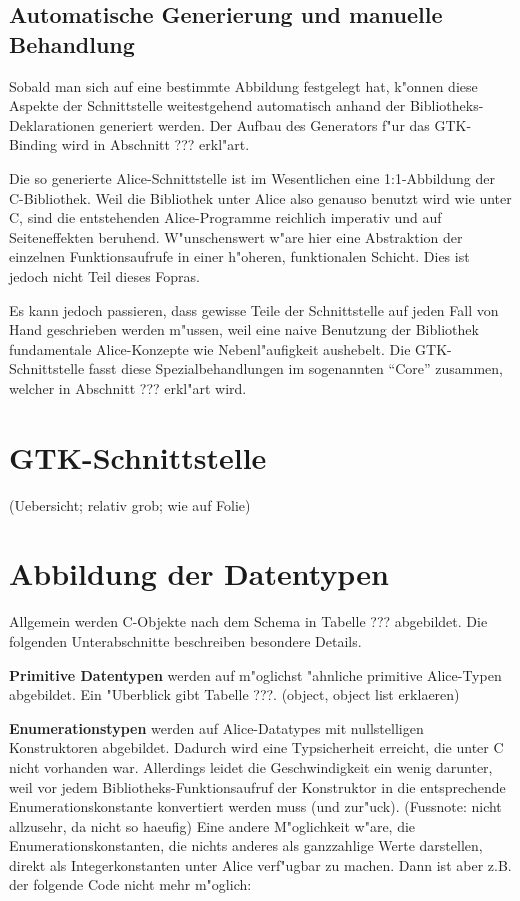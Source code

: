\documentclass{article}
\begin{document}
\subsection{Automatische Generierung und manuelle Behandlung}

Sobald man sich auf eine bestimmte Abbildung festgelegt hat, k"onnen diese
Aspekte der Schnittstelle weitestgehend automatisch anhand der Bibliotheks-
Deklarationen generiert werden. Der Aufbau des Generators f"ur das GTK-Binding
wird in Abschnitt ??? erkl"art.

Die so generierte Alice-Schnittstelle ist im Wesentlichen eine 1:1-Abbildung
der C-Bibliothek. Weil die Bibliothek unter Alice also genauso benutzt wird
wie unter C, sind die entstehenden Alice-Programme reichlich imperativ und auf
Seiteneffekten beruhend. W"unschenswert w"are hier eine Abstraktion der
einzelnen Funktionsaufrufe in einer h"oheren, funktionalen Schicht.
Dies ist jedoch nicht Teil dieses Fopras.

Es kann jedoch passieren, dass gewisse Teile der Schnittstelle auf jeden Fall
von Hand geschrieben werden m"ussen, weil eine naive Benutzung der Bibliothek
fundamentale Alice-Konzepte wie Nebenl"aufigkeit aushebelt. Die
GTK-Schnittstelle fasst diese Spezialbehandlungen im sogenannten ``Core''
zusammen, welcher in Abschnitt ??? erkl"art wird.

\section{GTK-Schnittstelle}

(Uebersicht; relativ grob; wie auf Folie)

\section{Abbildung der Datentypen}

Allgemein werden C-Objekte nach dem Schema in Tabelle ??? abgebildet.
Die folgenden Unterabschnitte beschreiben besondere Details. 

\textbf{Primitive Datentypen} werden auf m"oglichst "ahnliche primitive
Alice-Typen abgebildet. Ein "Uberblick gibt Tabelle ???.
(object, object list erklaeren)

\textbf{Enumerationstypen} werden auf Alice-Datatypes mit nullstelligen
Konstruktoren abgebildet. Dadurch wird eine Typsicherheit erreicht, die
unter C nicht vorhanden war. Allerdings leidet die Geschwindigkeit ein
wenig darunter, weil vor jedem Bibliotheks-Funktionsaufruf der Konstruktor
in die entsprechende Enumerationskonstante konvertiert werden muss
(und zur"uck). (Fussnote: nicht allzusehr, da nicht so haeufig)
Eine andere M"oglichkeit w"are, die Enumerationskonstanten,
die nichts anderes als ganzzahlige Werte darstellen, direkt als
Integerkonstanten unter Alice verf"ugbar zu machen. Dann ist aber z.B.
der folgende Code nicht mehr m"oglich:
\end{document}
